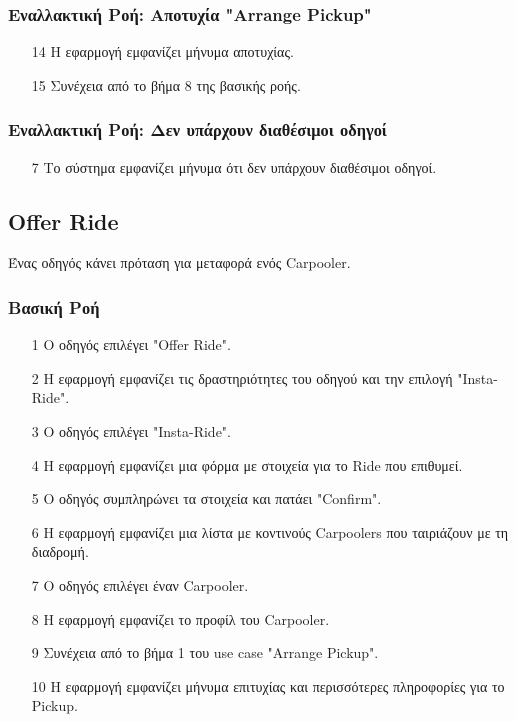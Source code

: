 \subsubsection{Εναλλακτική Ροή: Αποτυχία "Arrange Pickup"}

\begin{enumerate}
    \item[14] Η εφαρμογή εμφανίζει μήνυμα αποτυχίας.
    \item[15] Συνέχεια από το βήμα 8 της βασικής ροής.
\end{enumerate}

\subsubsection{Εναλλακτική Ροή: Δεν υπάρχουν διαθέσιμοι οδηγοί}

\begin{enumerate}
    \item[7] Το σύστημα εμφανίζει μήνυμα ότι δεν υπάρχουν διαθέσιμοι οδηγοί.
\end{enumerate}

\newpage

\subsection{Offer Ride}
\label{uc:offer-ride}

Ένας οδηγός κάνει πρόταση για μεταφορά ενός Carpooler.

\subsubsection{Βασική Ροή}

\begin{enumerate}
    \item[1] Ο οδηγός επιλέγει "Offer Ride".
    \item[2] Η εφαρμογή εμφανίζει τις δραστηριότητες του οδηγού και την επιλογή "Insta-Ride".
    \item[3] Ο οδηγός επιλέγει "Insta-Ride".
    \item[4] Η εφαρμογή εμφανίζει μια φόρμα με στοιχεία για το Ride που επιθυμεί.
    \item[5] Ο οδηγός συμπληρώνει τα στοιχεία και πατάει "Confirm".
    \item[6] Η εφαρμογή εμφανίζει μια λίστα με κοντινούς Carpoolers που ταιριάζουν με τη διαδρομή.
    \item[7] Ο οδηγός επιλέγει έναν Carpooler.
    \item[8] Η εφαρμογή εμφανίζει το προφίλ του Carpooler.
    \item[9] Συνέχεια από το βήμα 1 του use case "Arrange Pickup".
    \item[10] Η εφαρμογή εμφανίζει μήνυμα επιτυχίας και περισσότερες πληροφορίες για το Pickup.
\end{enumerate}

